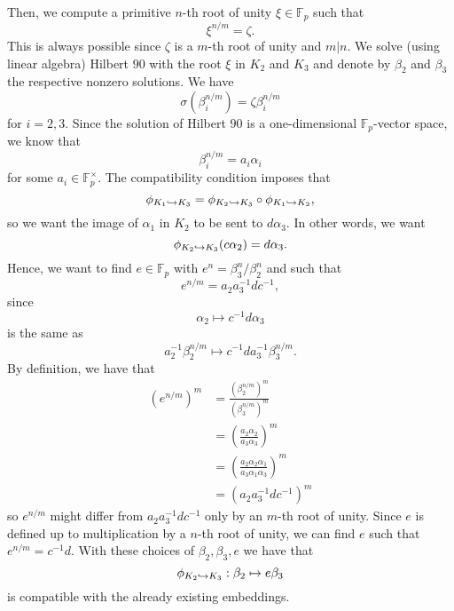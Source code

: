 \documentclass[a4paper,11pt]{article}
\begin{document}
Then, we compute a primitive $n$-th root of unity $\xi\in\mathbb{F}_p$ such that
\[
  \xi^{n/m}=\zeta.
\]
This is always possible since $\zeta$ is a $m$-th root of unity and $m|n$.
We solve (using linear algebra) Hilbert $90$ with the root
$\xi$ in $K_2$ and $K_3$ and denote by $\beta_2$ and $\beta_3$ the respective
nonzero solutions. We have
\[
  \sigma(\beta_i^{n/m})=\zeta\beta_i^{n/m}
\] for $i=2,3$. Since the solution of Hilbert $90$ is a one-dimensional
$\mathbb{F}_p$-vector space, we know that
\[
  \beta_i^{n/m}=a_i\alpha_i
\] for some $a_i\in\mathbb{F}_p^\times$. The compatibility condition imposes that 
\[
  \phi_{K_1\hookrightarrow K_3}=\phi_{K_2\hookrightarrow K_3}\circ\phi_{K_1\hookrightarrow K_2},
\]
so we want the image of $\alpha_1$ in $K_2$ to be sent to $d\alpha_3$. In other
words, we want
\[
  \phi_{K_2\hookrightarrow K_3}(c\alpha_2) = d\alpha_3.
\]
Hence, we want to find $e\in\mathbb{F}_p$ with $e^n=\beta_3^n/\beta_2^n$
and such that
\[
  e^{n/m}=a_2a_3^{-1}dc^{-1},
\]
since 
\[
  \alpha_2\mapsto c^{-1}d\alpha_3
\]
is the same as
\[
  a_2^{-1}\beta_2^{n/m}\mapsto c^{-1}da_3^{-1}\beta_3^{n/m}.
\]
By definition, we have that 
\begin{align*}
  (e^{n/m})^m &= \frac{(\beta_2^{n/m})^m}{(\beta_3^{n/m})^m}\\
  &= \left(\frac{a_2\alpha_2}{a_3\alpha_3}\right)^m\\
  &= \left(\frac{a_2\alpha_2\alpha_1}{a_3\alpha_1\alpha_3}\right)^m\\
  &= \left( a_2a_3^{-1}dc^{-1} \right)^m
\end{align*}
so $e^{n/m}$ might differ from $a_2a_3^{-1}dc^{-1}$ only by an $m$-th root of unity. Since $e$ is defined
up to multiplication by a $n$-th root of unity, we can find $e$ such that
$e^{n/m}=c^{-1}d$. With these choices of $\beta_2, \beta_3, e$ we have that 
\[
  \phi_{K_2\hookrightarrow K_3}:\beta_2\mapsto e\beta_3
\]
is compatible with the already existing embeddings.
\end{document}

